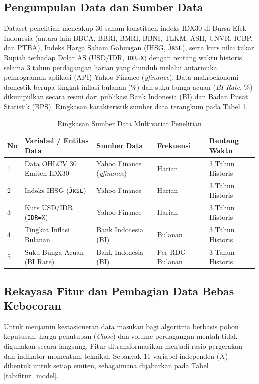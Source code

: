 \documentclass[10pt,a4paper]{article}
\begin{document}
\subsection{Pengumpulan Data dan Sumber Data}
Dataset penelitian mencakup 30 saham konstituen indeks IDX30 di Bursa Efek Indonesia (antara lain BBCA, BBRI, BMRI, BBNI, TLKM, ASII, UNVR, ICBP, dan PTBA), Indeks Harga Saham Gabungan (IHSG, \texttt{\^JKSE}), serta kurs nilai tukar Rupiah terhadap Dolar AS (USD/IDR, \texttt{IDR=X}) dengan rentang waktu historis selama 3 tahun perdagangan harian yang diunduh melalui antarmuka pemrograman aplikasi (API) Yahoo Finance (\textit{yfinance}). Data makroekonomi domestik berupa tingkat inflasi bulanan (\%) dan suku bunga acuan (\textit{BI Rate}, \%) dikumpulkan secara resmi dari publikasi Bank Indonesia (BI) dan Badan Pusat Statistik (BPS). Ringkasan karakteristik sumber data terangkum pada Tabel \ref{tab:sumber_data}.

\begin{table}[htbp]
  \centering
  \caption{Ringkasan Sumber Data Multivariat Penelitian}
  \label{tab:sumber_data}
  \fontsize{8.5pt}{11pt}\selectfont
  \begin{tabular}{lllll}
    \toprule
    \textbf{No} & \textbf{Variabel / Entitas Data} & \textbf{Sumber Data} & \textbf{Frekuensi} & \textbf{Rentang Waktu} \\
    \midrule
    1 & Data OHLCV 30 Emiten IDX30 & Yahoo Finance (\textit{yfinance}) & Harian & 3 Tahun Historis \\
    2 & Indeks IHSG (\texttt{\^JKSE}) & Yahoo Finance & Harian & 3 Tahun Historis \\
    3 & Kurs USD/IDR (\texttt{IDR=X}) & Yahoo Finance & Harian & 3 Tahun Historis \\
    4 & Tingkat Inflasi Bulanan & Bank Indonesia (BI) & Bulanan & 3 Tahun Historis \\
    5 & Suku Bunga Acuan (BI Rate) & Bank Indonesia (BI) & Per RDG Bulanan & 3 Tahun Historis \\
    \bottomrule
  \end{tabular}
\end{table}

\subsection{Rekayasa Fitur dan Pembagian Data Bebas Kebocoran}
Untuk menjamin kestasioneran data masukan bagi algoritma berbasis pohon keputusan, harga penutupan (\textit{Close}) dan volume perdagangan mentah tidak digunakan secara langsung. Fitur ditransformasikan menjadi rasio pergerakan dan indikator momentum teknikal. Sebanyak 11 variabel independen ($X$) dibentuk untuk setiap emiten, sebagaimana dijabarkan pada Tabel \ref{tab:fitur_model}.
\end{document}
